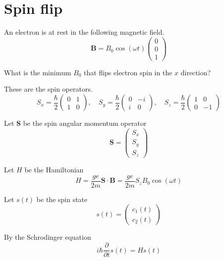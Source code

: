 

\section*{Spin flip}

An electron is at rest in the following magnetic field.
\begin{equation*}
\mathbf B=B_0\cos(\omega t)\begin{pmatrix}0\\0\\1\end{pmatrix}
\end{equation*}

What is the minimum $B_0$ that flips electron spin in the $x$ direction?

\bigskip
These are the spin operators.
\begin{equation*}
S_x=\frac{\hbar}{2}\begin{pmatrix}0&1\\1&0\end{pmatrix},\quad
S_y=\frac{\hbar}{2}\begin{pmatrix}0&-i\\i&0\end{pmatrix},\quad
S_z=\frac{\hbar}{2}\begin{pmatrix}1&0\\0&-1\end{pmatrix}
\end{equation*}

Let $\mathbf S$ be the spin angular momentum operator
\begin{equation*}
\mathbf S=\begin{pmatrix}S_x\\S_y\\S_z\end{pmatrix}
\end{equation*}

Let $H$ be the Hamiltonian
\begin{equation*}
H=\frac{ge}{2m}\mathbf S\cdot\mathbf B
=\frac{ge}{2m}S_zB_0\cos(\omega t)
\end{equation*}

Let $s(t)$ be the spin state
\begin{equation*}
s(t)=\begin{pmatrix}c_1(t)\\c_2(t)\end{pmatrix}
\end{equation*}

By the Schrodinger equation
\begin{equation*}
i\hbar\frac{\partial}{\partial t}s(t)=Hs(t)
\end{equation*}


